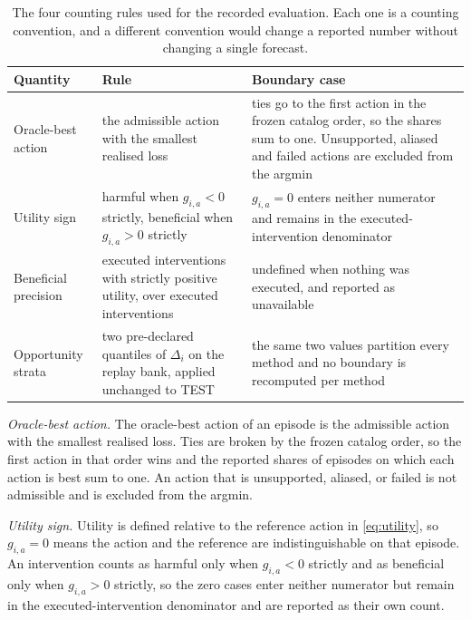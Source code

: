\documentclass{article}
\begin{document}
\begin{table}[htbp]
  \caption{The four counting rules used for the recorded evaluation. Each one is a
  counting convention, and a different convention would change a reported number
  without changing a single forecast.}
  \label{tab:app-counting}
  \centering
  \small
  \setlength{\tabcolsep}{4pt}
\begin{tabular}{@{}p{} p{} p{}@{}}
    \toprule
    Quantity & Rule & Boundary case \\
    \midrule
    Oracle-best action & the admissible action with the smallest realised loss & ties go to the first action in the frozen catalog order, so the shares sum to one. Unsupported, aliased and failed actions are excluded from the argmin \\
    Utility sign & harmful when $g_{i,a} < 0$ strictly, beneficial when $g_{i,a} > 0$ strictly & $g_{i,a} = 0$ enters neither numerator and remains in the executed-intervention denominator \\
    Beneficial precision & executed interventions with strictly positive utility, over executed interventions & undefined when nothing was executed, and reported as unavailable \\
    Opportunity strata & two pre-declared quantiles of $\Delta_i$ on the replay bank, applied unchanged to TEST & the same two values partition every method and no boundary is recomputed per method \\
    \bottomrule
  \end{tabular}
\end{table}

\emph{Oracle-best action.} The oracle-best action of an episode is the admissible action with
the smallest realised loss. Ties are broken by the frozen catalog order, so the first action in
that order wins and the reported shares of episodes on which each action is best sum to one. An
action that is unsupported, aliased, or failed is not admissible and is excluded from the
argmin.

\emph{Utility sign.} Utility is defined relative to the reference action in
\eqref{eq:utility}, so $g_{i,a} = 0$ means the action and the reference are indistinguishable on
that episode. An intervention counts as harmful only when $g_{i,a} < 0$ strictly and as
beneficial only when $g_{i,a} > 0$ strictly, so the zero cases enter neither numerator but remain in the executed-intervention denominator and are reported as their own count.
\end{document}
